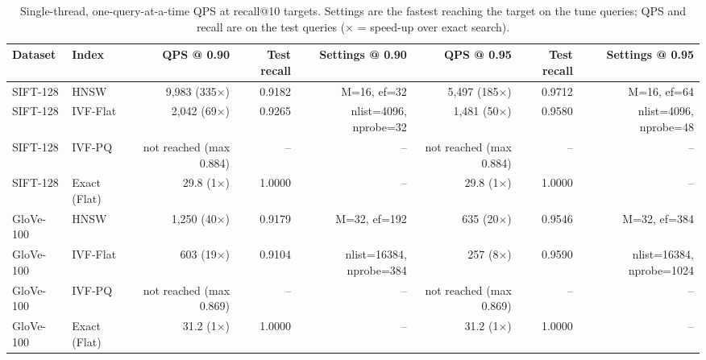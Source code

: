 \begin{table}[t]
\centering
\small
\caption{Single-thread, one-query-at-a-time QPS at recall@10 targets. Settings are the fastest reaching the target on the tune queries; QPS and recall are on the test queries ($\times$ = speed-up over exact search).}
\label{tab:t2a_qps_at_recall}
\begin{tabular}{llrrrrrr}
\toprule
Dataset & Index & QPS @ 0.90 & Test recall & Settings @ 0.90 & QPS @ 0.95 & Test recall & Settings @ 0.95 \\
\midrule
SIFT-128 & HNSW & 9,983 (335$\times$) & 0.9182 & M=16, ef=32 & 5,497 (185$\times$) & 0.9712 & M=16, ef=64 \\
SIFT-128 & IVF-Flat & 2,042 (69$\times$) & 0.9265 & nlist=4096, nprobe=32 & 1,481 (50$\times$) & 0.9580 & nlist=4096, nprobe=48 \\
SIFT-128 & IVF-PQ & not reached (max 0.884) & -- & -- & not reached (max 0.884) & -- & -- \\
SIFT-128 & Exact (Flat) & 29.8 (1$\times$) & 1.0000 & -- & 29.8 (1$\times$) & 1.0000 & -- \\
GloVe-100 & HNSW & 1,250 (40$\times$) & 0.9179 & M=32, ef=192 & 635 (20$\times$) & 0.9546 & M=32, ef=384 \\
GloVe-100 & IVF-Flat & 603 (19$\times$) & 0.9104 & nlist=16384, nprobe=384 & 257 (8$\times$) & 0.9590 & nlist=16384, nprobe=1024 \\
GloVe-100 & IVF-PQ & not reached (max 0.869) & -- & -- & not reached (max 0.869) & -- & -- \\
GloVe-100 & Exact (Flat) & 31.2 (1$\times$) & 1.0000 & -- & 31.2 (1$\times$) & 1.0000 & -- \\
\bottomrule
\end{tabular}
\end{table}
